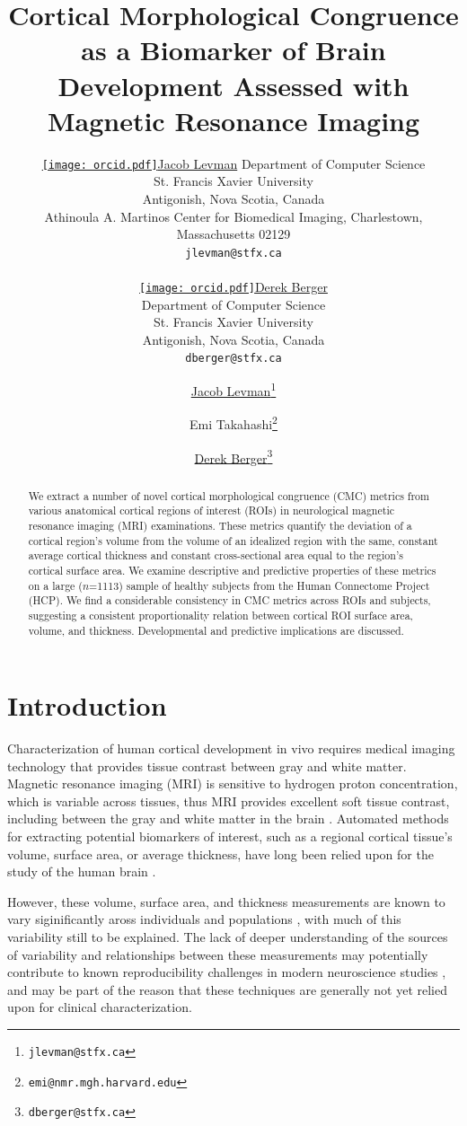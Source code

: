 \documentclass{article}
\title{Cortical Morphological Congruence as a Biomarker of Brain Development Assessed with Magnetic Resonance Imaging}
\author{%
	\href{https://orcid.org/0000-0002-9604-3157}{\texttt{[image: orcid.pdf]}\hspace{1mm}Jacob Levman}
	Department of Computer Science\\
	St. Francis Xavier University\\
	Antigonish, Nova Scotia, Canada\\
	Athinoula A. Martinos Center for Biomedical Imaging, Charlestown, Massachusetts 02129\\
	\texttt{jlevman@stfx.ca} \\

	\And

	\href{https://orcid.org/0000-0003-4733-0624}{\texttt{[image: orcid.pdf]}\hspace{1mm}Derek Berger} \\
	Department of Computer Science\\
	St. Francis Xavier University\\
	Antigonish, Nova Scotia, Canada\\
	\texttt{dberger@stfx.ca} \\
}
\author[1,2,3,4]{%
	\href{https://orcid.org/0000-0002-9604-3157}{\usebox{\orcid}\hspace{1mm}Jacob Levman\thanks{\texttt{jlevman@stfx.ca}}}%
}
\author[1,4]{%
	Emi Takahashi\thanks{\texttt{emi@nmr.mgh.harvard.edu}}%
}
\author[1]{%
	\href{https://orcid.org/0000-0003-4733-0624}{\usebox{\orcid}\hspace{1mm}Derek Berger\thanks{\texttt{dberger@stfx.ca}}}%
}
\affil[1]{Athinoula A. Martinos Center for Biomedical Imaging, Charlestown, Massachusetts 02129}
\affil[2]{Department of Computer Science, St. Francis Xavier University,Antigonish, Nova Scotia}
\affil[3]{Nova Scotia Health Authority, Halifax, NS, Canada}
\affil[4]{Harvard Medical School, Department of Radiology, Boston, MA, USA.}
\begin{document}
\maketitle

\begin{abstract}
We extract a number of novel cortical morphological congruence (CMC) metrics
from various anatomical cortical regions of interest (ROIs) in neurological
magnetic resonance imaging (MRI) examinations. These metrics quantify the
deviation of a cortical region's volume from the volume of an idealized
region with the same, constant average cortical thickness and constant
cross-sectional area equal to the region's cortical surface area. We examine
descriptive and predictive properties of these metrics on a large
(\(n\)=1113) sample of healthy subjects from the Human Connectome Project
(HCP). We find a considerable consistency in CMC metrics across ROIs and
subjects, suggesting a consistent proportionality relation between cortical
ROI surface area, volume, and thickness. Developmental and predictive
implications are discussed.
\end{abstract}




\section{Introduction} \label{intro}

Characterization of human cortical development in vivo requires medical
imaging technology that provides tissue contrast between gray and white
matter. Magnetic resonance imaging (MRI) is sensitive to hydrogen proton
concentration, which is variable across tissues, thus MRI provides excellent
soft tissue contrast, including between the gray and white matter in the
brain \citep{duboisMRINeonatalBrain2021}. Automated methods for extracting
potential biomarkers of interest, such as a regional cortical tissue's
volume, surface area, or average thickness, have long been relied upon for
the study of the human brain
\citep{fischlFreeSurfer2012,levmanPediatricStructuralMRI2017,levmanStructuralMagneticResonance2019a,mccannStructuralMagneticResonance2021}.

However, these volume, surface area, and thickness measurements are known to
vary siginificantly aross individuals and populations
\citep{fischlFreeSurfer2012,levmanPediatricStructuralMRI2017,levmanStructuralMagneticResonance2019a},
with much of this variability still to be explained. The lack of deeper
understanding of the sources of variability and relationships between these
measurements may potentially contribute to known reproducibility challenges
in modern neuroscience studies
\citep{martinezReproducibilityBraincognitionRelationships2015,marekReproducibleBrainwideAssociation2022},
and may be part of the reason that these techniques are generally not yet
relied upon for clinical characterization.
\end{document}
